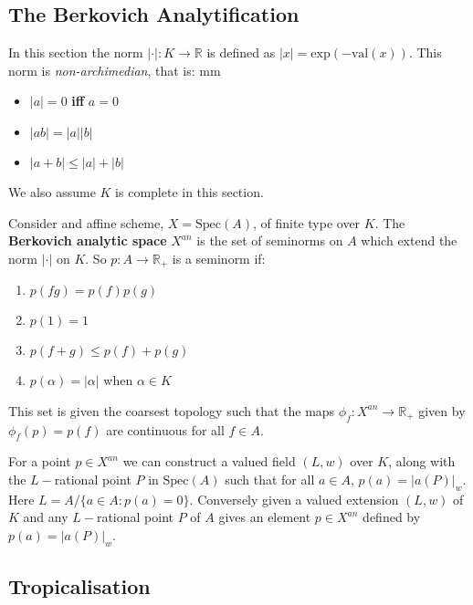\subsection{The Berkovich Analytification}
    In this section the norm $|\cdot |:K \to \mathbb{R}$ is defined as $|x| = \text{exp}(-\text{val}(x))$. This norm is \textit{non-archimedian}, that is: 
mm
    \begin{itemize}
        \item $|a| = 0$ \textbf{iff} $a=0$
        \item $|ab| = |a||b|$
        \item $|a+b| \leq |a|+|b|$
    \end{itemize}
    We also assume $K$ is complete in this section.
    \begin{definition}
        Consider and affine scheme, $X = \text{Spec}(A)$, of finite type over $K$. 
        The \textbf{Berkovich analytic space} $X^{an}$ is the set of seminorms on $A$ which extend the norm $|\cdot|$ on $K$. 
        So $p:A \to \mathbb{R}_{+}$ is a seminorm if:
        \begin{enumerate}
            \item $p(fg) = p(f)p(g)$
            \item $p(1)=1$
            \item $p(f+g)\leq p(f)+p(g)$
            \item $p(\alpha) = |\alpha|$ when $\alpha \in K$
        \end{enumerate}
        This set is given the coarsest topology such that the maps $\phi_f:X^{an}\to \mathbb{R}_{+}$ given by $\phi_f(p) = p(f)$ are continuous for all $f \in A$.
    \end{definition}
    For a point $p \in X^{an}$ we can construct a valued field $(L,w)$ over $K$, along with the $L-$rational point $P$ in $\text{Spec}(A)$ such that for all $a \in A$, $p(a) = |a(P)|_{w}$. 
    Here $L = A/\{a \in A: p(a)=0\}$. 
    Conversely given a valued extension $(L,w)$ of $K$ and any $L-$rational point $P$ of $A$ gives an element $p \in X^{an}$ defined by $p(a) = |a(P)|_{w}$.
\subsection{Tropicalisation}


